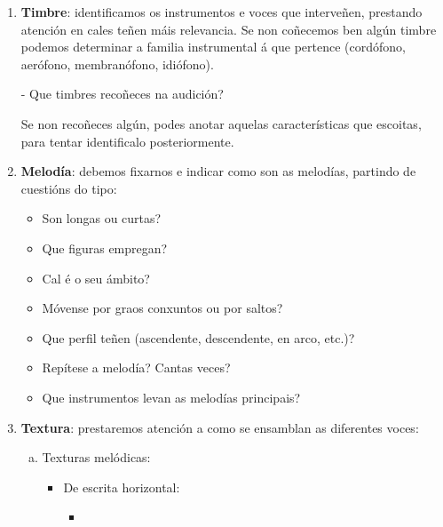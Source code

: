     \begin{enumerate}[1.-]
        \item %
        \textbf{Timbre}: identificamos os instrumentos e voces que interveñen, prestando atención en cales teñen máis relevancia. Se non coñecemos ben algún timbre podemos determinar a familia instrumental á que pertence (cordófono, aerófono, membranófono, idiófono).
        \par %
        - Que timbres recoñeces na audición? \dotfill
        \par %
        Se non recoñeces algún, podes anotar aquelas características que escoitas, para tentar identificalo posteriormente.
        \item %
        \textbf{Melodía}: debemos fixarnos e indicar como son as melodías, partindo de cuestións do tipo: 
        \begin{multicols}{2}
        \begin{itemize}
            \item 
            Son longas ou curtas? \dotfill
            \item 
            Que figuras empregan? \dotfill
            \item
            Cal é o seu ámbito? \dotfill
            \item
            Móvense por graos conxuntos ou por saltos? \dotfill
            \item
            Que perfil teñen (ascendente, descendente, en arco, etc.)? \dotfill
            \item
            Repítese a melodía? Cantas veces? \dotfill
            \item
            Que instrumentos levan as melodías principais? \dotfill
        \end{itemize}
        \end{multicols}
%
        \item %
        \textbf{Textura}: prestaremos atención a como se ensamblan as diferentes voces:
            \begin{enumerate}[a)]
                \item Texturas melódicas: 
                \begin{itemize}
                    \item
                    De escrita horizontal: 
                    \begin{itemize}
                        \item 

\end{itemize}
\end{itemize}
\end{enumerate}
\end{enumerate}
